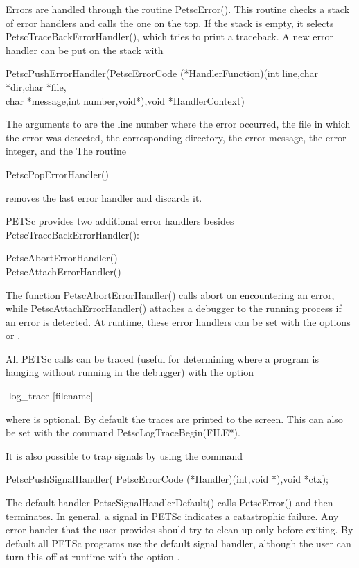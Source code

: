{{{Errors are handled through the routine PetscError().
This routine
checks a stack of error handlers and calls the one on the top.
If the stack is empty, it selects PetscTraceBackErrorHandler(),
which tries to print a traceback.
A new error handler can be put on the stack with
\begin{tabbing}
  PetscPushErrorHandler(PetscErrorCode (*HandlerFunction)(int line,char *dir,char *file,\\
                                char *message,int number,void*),void *HandlerContext)
\end{tabbing}
The arguments to  are the line number where
the error occurred, the file in which the error was detected, the corresponding
directory, the error message, the error integer, and the 
The routine
\begin{tabbing}
  PetscPopErrorHandler()
\end{tabbing}
removes the last error handler and discards it.

PETSc provides two additional error handlers besides
PetscTraceBackErrorHandler():
\begin{tabbing}
   PetscAbortErrorHandler()\\
   PetscAttachErrorHandler()
\end{tabbing}
The function PetscAbortErrorHandler() calls abort on encountering an error, while
PetscAttachErrorHandler() attaches a debugger to the running process
if an error is detected. At runtime, these error handlers can be set
with the options  or   .

All PETSc calls can be traced (useful for determining where a program is
hanging without running in the debugger) with the option
\begin{tabbing}
  -log\_trace [filename]
\end{tabbing}
where  is optional. By default the traces are printed to the
screen.  This can also be set with the
command PetscLogTraceBegin(FILE*). 


It is also possible to trap signals by using the 
command
\begin{tabbing}
  PetscPushSignalHandler( PetscErrorCode (*Handler)(int,void *),void *ctx);
\end{tabbing}
The default handler PetscSignalHandlerDefault()
calls
PetscError() and then terminates. In general, a signal in PETSc
indicates a catastrophic failure.  Any error hander that the user provides
should try to clean up only before exiting.  By default all PETSc programs
use the default signal handler, although the user can turn this off
at runtime with the
option  .

}}}
